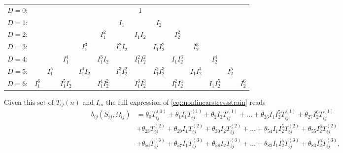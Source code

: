 \documentclass[10pt,a4paper,twoside]{article}
\newcommand{\B}{\bm{\mathcal{B}}}
\newcommand{\bij}{b_{ij}}
\newcommand{\Sij}{S_{ij}}
\newcommand{\Oij}{\Omega_{ij}}
\begin{document}

\begin{center}
\begin{tabular}{rccccccccccccc}
$D=0$:& & & & & & & 1\\
$D=1$:& & & & & & $I_1$ & & $I_2$\\
$D=2$:& & & & & $I_1^2$ & & $I_1I_2$ & & $I_2^2$ \\
$D=3$:& & & & $I_1^3$ & & $I_1^2I_2$ & & $I_1I_2^2$ & & $I_2^3$ \\
$D=4$:& & & $I_1^4$ & & $I_1^3I_2$ & & $I_1^2I_2^2$ & & $I_1I_2^3$ & & $I_2^4$ \\
$D=5$:& & $I_1^5$ & & $I_1^4I_2$ & & $I_1^3I_2^2$ & & $I_1^2 I_2^3$ & & $I_1I_2^4$ & &$I_2^5$\\
$D=6$:& $I_1^6$ & & $I_1^5I_2$ & & $I_1^4I_2^2$ & & $I_1^3 I_2^3$ & & $I_1^2 I_2^4$ & & $I_1 I_2^5$ & & $I_2^6$ 
\end{tabular}
\end{center}

Given this set of $T_{ij}{(n)}$ and $I_m$ the full expression of \eqref{eq::nonlinearstressstrain} reads
\begin{align}
\bij(\Sij, \Oij) &= \theta_0 T_{ij}^{(1)} + \theta_1 I_1 T_{ij}^{(1)} + \theta_2 I_2 T_{ij}^{(1)} + \dots + \theta_{26} I_1 I_2^5 T_{ij}^{(1)} + \theta_{27} I_2^6 T_{ij}^{(1)} \nonumber \\
&+ \theta_{28} T_{ij}^{(2)} + \theta_{29} I_1 T_{ij}^{(2)} + \theta_{30} I_2 T_{ij}^{(2)} + \dots + \theta_{54} I_1 I_2^5 T_{ij}^{(2)} + \theta_{55} I_2^6 T_{ij}^{(2)} \nonumber \\
&+ \theta_{56} T_{ij}^{(3)} + \theta_{57} I_1 T_{ij}^{(3)} + \theta_{58} I_2 T_{ij}^{(3)} + \dots + \theta_{82} I_1 I_2^5 T_{ij}^{(3)} + \theta_{83} I_2^6 T_{ij}^{(3)}, 
\end{align}
\end{document}
